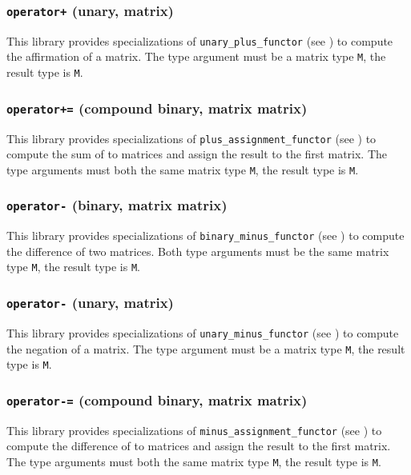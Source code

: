 \documentclass[oneside]{book}
\begin{document}
\subsubsection{\texttt{operator+} (unary, matrix)}
This library provides specializations of
\texttt{unary\_plus\_functor}
(see \cite{arithmeticfunctors}) to compute
the affirmation
of a matrix.
The type argument must be a matrix type \texttt{M}, the result type is \texttt{M}.

\subsubsection{\texttt{operator+=} (compound binary, matrix matrix)}
This library provides specializations of
\texttt{plus\_assignment\_functor}
(see \cite{arithmeticfunctors}) to compute
the sum of to matrices and assign the result to the first matrix.
The type arguments must both the same matrix type \texttt{M}, the result type is \texttt{M}.

\subsubsection{\texttt{operator-} (binary, matrix matrix)}
This library provides specializations of
\texttt{binary\_minus\_functor}
(see \cite{arithmeticfunctors}) to compute the
difference
of two matrices. Both type arguments must be the same matrix type \texttt{M}, the result type is \texttt{M}.

\subsubsection{\texttt{operator-} (unary, matrix)}
This library provides specializations of
\texttt{unary\_minus\_functor}
(see \cite{arithmeticfunctors}) to compute
the negation
of a matrix.
The type argument must be a matrix type \texttt{M}, the result type is \texttt{M}.

\subsubsection{\texttt{operator-=} (compound binary, matrix matrix)}
This library provides specializations of
\texttt{minus\_assignment\_functor}
(see \cite{arithmeticfunctors}) to compute
the difference of to matrices and assign the result to the first matrix.
The type arguments must both the same matrix type \texttt{M}, the result type is \texttt{M}.
\end{document}
